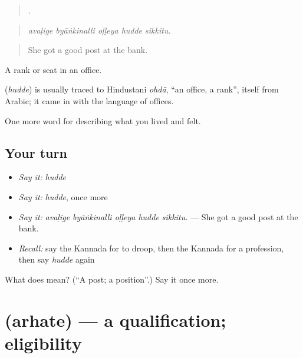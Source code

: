 \begin{quote}
    .
\end{quote}

\begin{quote}
\emph{avaḷige byāṅkinalli oḷḷeya hudde sikkitu.}
\end{quote}

\begin{quote}
She got a good post at the bank.
\end{quote}

A rank or seat in an office.

\begin{cousinweb}
\textbf{} (\emph{hudde}) is usually traced to Hindustani \emph{ohdā}, \textquotedblleft{}an office, a rank\textquotedblright{}, itself from Arabic; it came in with the language of offices.
\end{cousinweb}

\begin{grammarlens}[title={What you've built}]
One more word for describing what you lived and felt.
\end{grammarlens}

\subsection*{Your turn}
\begin{itemize}
\raggedright
  \item \emph{Say it:} \emph{hudde}
  \item \emph{Say it:} \emph{hudde}, once more
  \item \emph{Say it:} \emph{avaḷige byāṅkinalli oḷḷeya hudde sikkitu.} — She got a good post at the bank.
  \item \emph{Recall:} say the Kannada for to droop, then the Kannada for a profession, then say \emph{hudde} again
\end{itemize}

\begin{tcolorbox}[breakable,colback=teal!4,colframe=teal!35!black,title={Before you move on}]
What does  mean? (\textquotedblleft{}A post; a position\textquotedblright{}.) Say it once more.
\end{tcolorbox}
\section[\texorpdfstring{\kn{ಅರ್ಹತೆ} (arhate)}{ಅರ್ಹತೆ (arhate)}]{ (arhate) — a qualification; eligibility}

